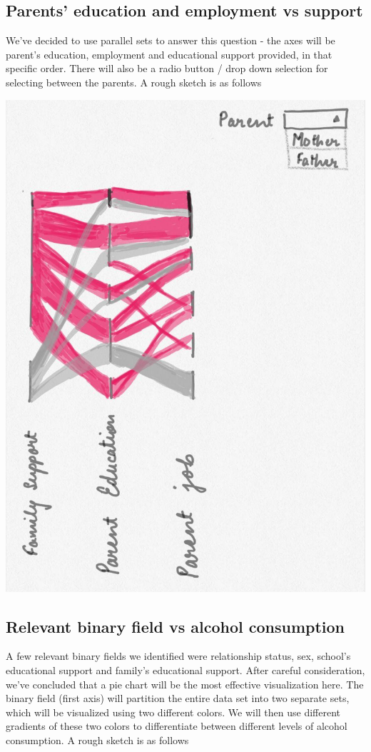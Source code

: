 \documentclass[titlepage, 12pt]{article}
\begin{document}
\subsection{Parents' education and employment vs support}
We've decided to use parallel sets to answer this question - the axes will be
parent's education, employment and educational support provided, in that
specific order. There will also be a radio button / drop down selection for
selecting between the parents. A rough sketch is as follows

\begin{center}
\includegraphics[scale=0.3]{1}
\end{center}

\subsection{Relevant binary field vs alcohol consumption}
A few relevant binary fields we identified were relationship status, sex,
school's educational support and family's educational support.  After careful
consideration, we've concluded that a pie chart will be the most effective
visualization here. The binary field (first axis) will partition the entire data
set into two separate sets, which will be visualized using two different colors.
We will then use different gradients of these two colors to differentiate
between different levels of alcohol consumption. A rough sketch is as follows
\end{document}
